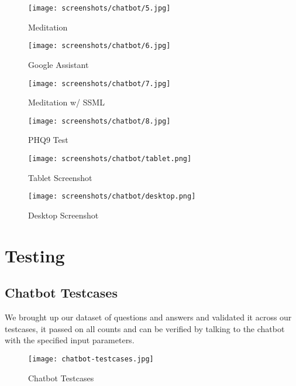 \pagebreak

\vspace*{\fill}
\begin{figure}[H]
    \centering
    \begin{minipage}{0.45\textwidth}
        \centering
        \texttt{[image: screenshots/chatbot/5.jpg]}
        \caption{Meditation}
    \end{minipage}\hfill
    \begin{minipage}{0.45\textwidth}
        \centering
        \texttt{[image: screenshots/chatbot/6.jpg]}
        \caption{Google Assistant}
    \end{minipage}
\end{figure}
\vspace*{\fill}

\pagebreak

\vspace*{\fill}
\begin{figure}[H]
    \centering
    \begin{minipage}{0.45\textwidth}
        \centering
        \texttt{[image: screenshots/chatbot/7.jpg]}
        \caption{Meditation w/ SSML}
    \end{minipage}\hfill
    \begin{minipage}{0.45\textwidth}
        \centering
        \texttt{[image: screenshots/chatbot/8.jpg]}
        \caption{PHQ9 Test}
    \end{minipage}
\end{figure}
\vspace*{\fill}

\pagebreak

\vspace*{\fill}
\begin{figure}[H]
    \centering
    \texttt{[image: screenshots/chatbot/tablet.png]}
    \caption{Tablet Screenshot}
\end{figure}

\begin{figure}[H]
    \centering
    \texttt{[image: screenshots/chatbot/desktop.png]}
    \caption{Desktop Screenshot}
\end{figure}
\vspace*{\fill}

\pagebreak

\section{Testing}

\subsection{Chatbot Testcases}

\noindent
We brought up our dataset of questions and answers and validated it across our testcases, it passed on all counts and can be verified by talking to the chatbot with the specified input parameters.

\begin{figure}[H]
    \centering
    \texttt{[image: chatbot-testcases.jpg]}
    \caption{Chatbot Testcases}
\end{figure}